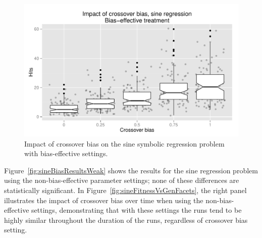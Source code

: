 \documentclass{sig-alternate}
\begin{document}
\begin{figure}[t]
\centering
\includegraphics[width=0.45 \textwidth]{Plots/Sine_XO_impact_strong_boxplot.pdf}
\caption{Impact of crossover bias on the sine symbolic regression problem with bias-effective settings.}
\label{fig:sineBiasResultsStrong}
\end{figure}

%
%
%
%

%
%
%
%

Figure~\ref{fig:sineBiasResultsWeak} shows the results for the sine regression problem using the non-bias-effective
parameter settings; none of these differences are
statistically significant. In Figure~\ref{fig:sineFitnessVsGenFacets}, the right panel illustrates the impact of
crossover bias over time when using the non-bias-effective settings, demonstrating that with these settings the runs
tend to be highly similar throughout the duration of the runs, regardless of crossover bias setting. 

\end{document}
